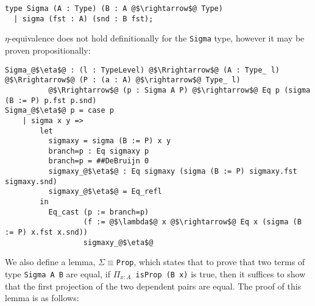 \documentclass[12pt,twoside,maitrise]{dms}
\theoremstyle{definition}
\numberwithin{equation}{section}
\numberwithin{table}{chapter}
\numberwithin{figure}{chapter}
\newcommand\id[1] {\texttt{#1}}
\newcommand\fn[1] {\texttt{#1}}
\begin{document}
\begin{verbatim}
type Sigma (A : Type) (B : A @$\rightarrow$@ Type)
  | sigma (fst : A) (snd : B fst);
\end{verbatim}

$\eta$-equivalence does not hold definitionally for the \id{Sigma} type, however
it may be proven propositionally:

\begin{verbatim}
Sigma_@$\eta$@ : (l : TypeLevel) @$\Rrightarrow$@ (A : Type_ l) @$\Rrightarrow$@ (P : (a : A) @$\rightarrow$@ Type_ l)
          @$\Rrightarrow$@ (p : Sigma A P) @$\rightarrow$@ Eq p (sigma (B := P) p.fst p.snd)
Sigma_@$\eta$@ p = case p
    | sigma x y =>
        let
          sigmaxy = sigma (B := P) x y
          branch=p : Eq sigmaxy p
          branch=p = ##DeBruijn 0
          sigmaxy_@$\eta$@ : Eq sigmaxy (sigma (B := P) sigmaxy.fst sigmaxy.snd)
          sigmaxy_@$\eta$@ = Eq_refl
        in
          Eq_cast (p := branch=p)
                  (f := @$\lambda$@ x @$\rightarrow$@ Eq x (sigma (B := P) x.fst x.snd))
                  sigmaxy_@$\eta$@
\end{verbatim}

We also define a lemma, \id{$\Sigma${}$\equiv${}Prop}, which states that to
prove that two terms of type \fn{Sigma A B} are equal, if \fn{$\Pi_{x:A}$ isProp
  (B x)} is true, then it suffices to show that the first projection of the two
dependent pairs are equal. The proof of this lemma is as follows:
\end{document}
